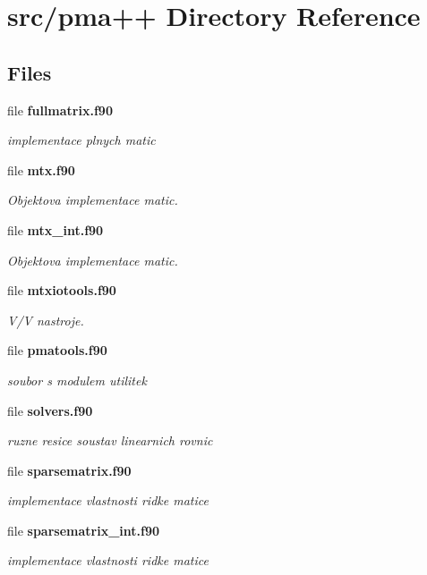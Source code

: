 \section{src/pma++ Directory Reference}
\label{dir_5a363d075f3b14a3497e14998a4daed6}
\subsection*{Files}
\begin{DoxyCompactItemize}
\item 
file {\bf fullmatrix.\+f90}
\begin{DoxyCompactList}\small\item\em implementace plnych matic \end{DoxyCompactList}\item 
file {\bf mtx.\+f90}
\begin{DoxyCompactList}\small\item\em Objektova implementace matic. \end{DoxyCompactList}\item 
file {\bf mtx\+\_\+int.\+f90}
\begin{DoxyCompactList}\small\item\em Objektova implementace matic. \end{DoxyCompactList}\item 
file {\bf mtxiotools.\+f90}
\begin{DoxyCompactList}\small\item\em V/V nastroje. \end{DoxyCompactList}\item 
file {\bf pmatools.\+f90}
\begin{DoxyCompactList}\small\item\em soubor s modulem utilitek \end{DoxyCompactList}\item 
file {\bf solvers.\+f90}
\begin{DoxyCompactList}\small\item\em ruzne resice soustav linearnich rovnic \end{DoxyCompactList}\item 
file {\bf sparsematrix.\+f90}
\begin{DoxyCompactList}\small\item\em implementace vlastnosti ridke matice \end{DoxyCompactList}\item 
file {\bf sparsematrix\+\_\+int.\+f90}
\begin{DoxyCompactList}\small\item\em implementace vlastnosti ridke matice \end{DoxyCompactList}\end{DoxyCompactItemize}
